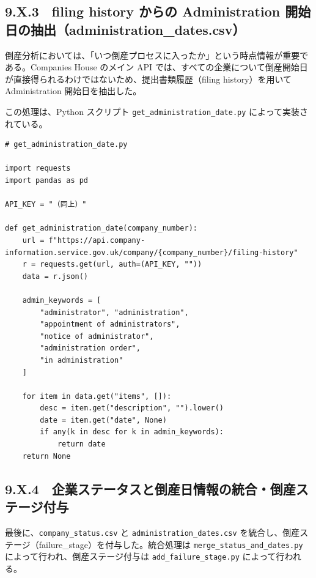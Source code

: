 \subsection*{9.X.3　filing history からの Administration 開始日の抽出（administration\_dates.csv）}

倒産分析においては、「いつ倒産プロセスに入ったか」という時点情報が重要である。Companies House のメイン API では、すべての企業について倒産開始日が直接得られるわけではないため、提出書類履歴（filing history）を用いて Administration 開始日を抽出した。

この処理は、Python スクリプト \texttt{get\_administration\_date.py} によって実装されている。


\begin{verbatim}
# get_administration_date.py

import requests
import pandas as pd

API_KEY = "（同上）"

def get_administration_date(company_number):
    url = f"https://api.company-information.service.gov.uk/company/{company_number}/filing-history"
    r = requests.get(url, auth=(API_KEY, ""))
    data = r.json()

    admin_keywords = [
        "administrator", "administration",
        "appointment of administrators",
        "notice of administrator",
        "administration order",
        "in administration"
    ]

    for item in data.get("items", []):
        desc = item.get("description", "").lower()
        date = item.get("date", None)
        if any(k in desc for k in admin_keywords):
            return date
    return None
\end{verbatim}


\subsection*{9.X.4　企業ステータスと倒産日情報の統合・倒産ステージ付与}

最後に、\texttt{company\_status.csv} と \texttt{administration\_dates.csv} を統合し、倒産ステージ（failure\_stage）を付与した。統合処理は \texttt{merge\_status\_and\_dates.py} によって行われ、倒産ステージ付与は \texttt{add\_failure\_stage.py} によって行われる。


